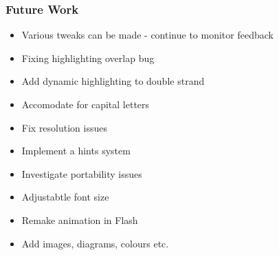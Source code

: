 \begin{frame}
\frametitle{Future Work}
\begin{itemize}
\item Various tweaks can be made - continue to monitor feedback
\item Fixing highlighting overlap bug
\item Add dynamic highlighting to double strand
\item Accomodate for capital letters
\item Fix resolution issues 
\item Implement a hints system
\item Investigate portability issues
\item Adjustabtle font size
\item Remake animation in Flash
\item Add images, diagrams, colours etc.
\end{itemize}
\end{frame}    


